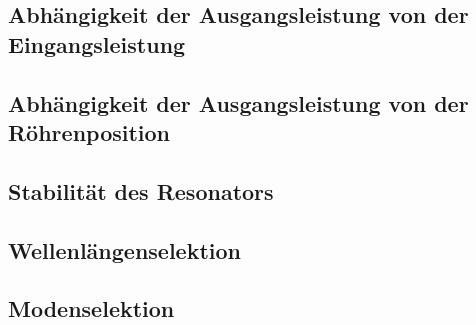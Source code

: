 \documentclass[../main.tex]{subfiles}
\begin{document}
\subsection{Abhängigkeit der Ausgangsleistung von der Eingangsleistung}
    

\subsection{Abhängigkeit der Ausgangsleistung von der Röhrenposition}
    

\subsection{Stabilität des Resonators}
    

\subsection{Wellenlängenselektion}
    

\subsection{Modenselektion}

\end{document}
